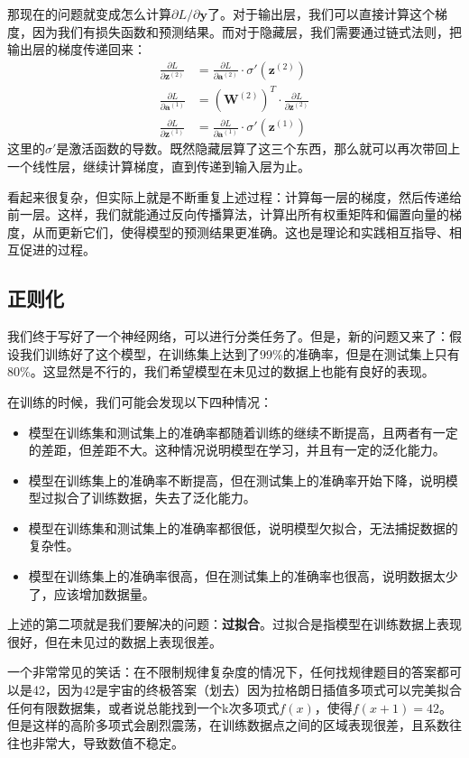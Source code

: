 那现在的问题就变成怎么计算$\partial L / \partial \mathbf{y}$了。对于输出层，我们可以直接计算这个梯度，因为我们有损失函数和预测结果。而对于隐藏层，我们需要通过链式法则，把输出层的梯度传递回来：
\begin{align*}
\frac{\partial L}{\partial \mathbf{z}^{(2)}} &= \frac{\partial L}{\partial \mathbf{a}^{(2)}} \cdot \sigma'(\mathbf{z}^{(2)}) \\
\frac{\partial L}{\partial \mathbf{a}^{(1)}} &= (\mathbf{W}^{(2)})^T \cdot \frac{\partial L}{\partial \mathbf{z}^{(2)}} \\
\frac{\partial L}{\partial \mathbf{z}^{(1)}} &= \frac{\partial L}{\partial \mathbf{a}^{(1)}} \cdot \sigma'(\mathbf{z}^{(1)})
\end{align*}
这里的$\sigma'$是激活函数的导数。既然隐藏层算了这三个东西，那么就可以再次带回上一个线性层，继续计算梯度，直到传递到输入层为止。

看起来很复杂，但实际上就是不断重复上述过程：计算每一层的梯度，然后传递给前一层。这样，我们就能通过反向传播算法，计算出所有权重矩阵和偏置向量的梯度，从而更新它们，使得模型的预测结果更准确。这也是理论和实践相互指导、相互促进的过程。

\subsection{正则化}

我们终于写好了一个神经网络，可以进行分类任务了。但是，新的问题又来了：假设我们训练好了这个模型，在训练集上达到了99\%的准确率，但是在测试集上只有80\%。这显然是不行的，我们希望模型在未见过的数据上也能有良好的表现。

在训练的时候，我们可能会发现以下四种情况：
\begin{itemize}
    \item 模型在训练集和测试集上的准确率都随着训练的继续不断提高，且两者有一定的差距，但差距不大。这种情况说明模型在学习，并且有一定的泛化能力。
    \item 模型在训练集上的准确率不断提高，但在测试集上的准确率开始下降，说明模型过拟合了训练数据，失去了泛化能力。
    \item 模型在训练集和测试集上的准确率都很低，说明模型欠拟合，无法捕捉数据的复杂性。
    \item 模型在训练集上的准确率很高，但在测试集上的准确率也很高，说明数据太少了，应该增加数据量。
\end{itemize}
上述的第二项就是我们要解决的问题：\textbf{过拟合}。过拟合是指模型在训练数据上表现很好，但在未见过的数据上表现很差。

一个非常常见的笑话：在不限制规律复杂度的情况下，任何找规律题目的答案都可以是42，因为42是宇宙的终极答案（划去）因为拉格朗日插值多项式可以完美拟合任何有限数据集，或者说总能找到一个k次多项式$f(x)$，使得$f(x+1)=42$。但是这样的高阶多项式会剧烈震荡，在训练数据点之间的区域表现很差，且系数往往也非常大，导致数值不稳定。

